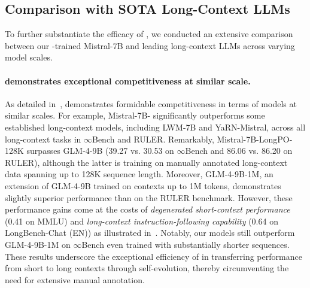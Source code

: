 \subsection{Comparison with SOTA Long-Context LLMs}
\label{subsec:external_comparison}

To further substantiate the efficacy of \ourMethod{}, we conducted an extensive comparison between our \ourMethod{}-trained Mistral-7B and leading long-context LLMs across varying model scales.

\paragraph{\ourMethod{} demonstrates exceptional competitiveness at similar scale.}

As detailed in~, \ourMethod{} demonstrates formidable competitiveness in terms of models at similar scales. For example, Mistral-7B-\ourMethod{} significantly outperforms some established long-context models, including LWM-7B and YaRN-Mistral, across all long-context tasks in $\infty$Bench and RULER. Remarkably, Mistral-7B-LongPO-128K surpasses GLM-4-9B (39.27 vs. 30.53 on $\infty$Bench and 86.06 vs. 86.20 on RULER), although the latter is training on manually annotated long-context data spanning up to 128K sequence length. 
Moreover, GLM-4-9B-1M, an extension of GLM-4-9B trained on contexts up to 1M tokens, demonstrates slightly superior performance than \ourMethod{} on the RULER benchmark. However, these performance gains come at the costs of \textit{degenerated short-context performance} (0.41 on MMLU) and \textit{long-context instruction-following capability} (0.64 on LongBench-Chat (EN)) as illustrated in~. Notably, our models still outperform GLM-4-9B-1M on $\infty$Bench even trained with substantially shorter sequences.
These results underscore the exceptional efficiency of \ourMethod{} in transferring performance from short to long contexts through self-evolution, thereby circumventing the need for extensive manual annotation.




